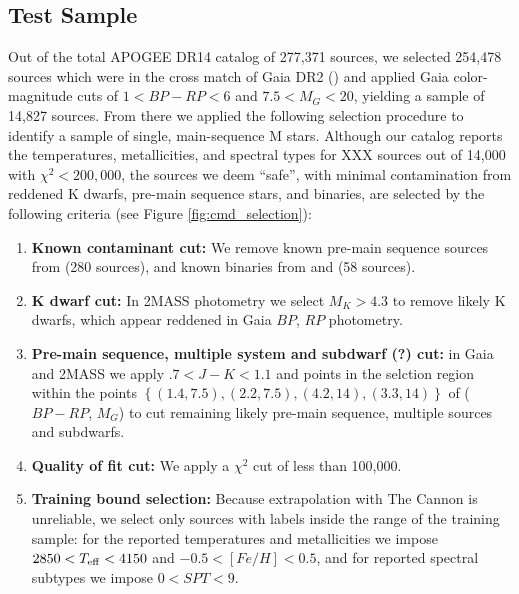 \documentclass[preprint]{aastex62}
\begin{document}
\color{gcolor}{Further assessment of the reliability of our model for late types?...}\color{black}


\subsection{Test Sample \label{subsec:test_selection}} 
Out of the total APOGEE DR14 catalog of 277,371 sources, we selected 254,478 sources which were in the cross match of Gaia DR2 (\citealt{Brown:2018}) and applied Gaia color-magnitude cuts of $1<BP-RP<6$ and $7.5<M_G<20$, yielding a sample of 14,827 sources. From there we applied the following selection procedure to identify a sample of single, main-sequence M stars. Although our catalog reports the temperatures, metallicities, and spectral types for XXX sources out of 14,000 with $\chi^2<200,000$, the sources we deem ``safe'', with minimal contamination from reddened K dwarfs, pre-main sequence stars, and binaries, are selected by the following criteria (see Figure \ref{fig:cmd_selection}):

\begin{enumerate}
\item \textbf{Known contaminant cut:} We remove known pre-main sequence sources from \citealt{Cottaar:2014} (280 sources), and known binaries from \citealt{ElBadry:2018} and \citealt{Skinner:2018} (58 sources).

\item \textbf{K dwarf cut:} In 2MASS photometry we select $M_K > 4.3$ to remove likely K dwarfs, which appear reddened in Gaia $BP$, $RP$ photometry.

\item \textbf{Pre-main sequence, multiple system and subdwarf (?) cut:} in Gaia and 2MASS we apply $.7<J-K<1.1$ and points in the selction region within the points $\left\{ (1.4, 7.5), (2.2, 7.5), (4.2, 14), (3.3, 14) \right\}$ of ($BP-RP$, $M_G$) to cut remaining likely pre-main sequence, multiple sources and subdwarfs.

\item \textbf{Quality of fit cut:} We apply a $\chi^2$ cut of less than 100,000.

\item \textbf{Training bound selection:} Because extrapolation with The Cannon is unreliable, we select only sources with labels inside the range of the training sample: for the reported temperatures and metallicities we impose $2850<T_{\rm eff}<4150$ and $-0.5<[Fe/H]<0.5$, and for reported spectral subtypes we impose $0<SPT<9$.
\end{enumerate}
\end{document}
